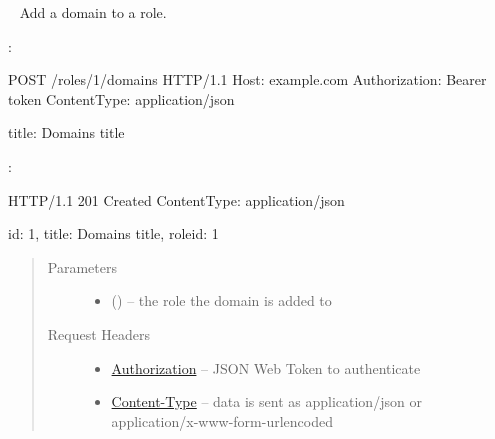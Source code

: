 \documentclass[letterpaper,10pt,english]{sphinxmanual}
\begin{document}
\begin{DUlineblock}{0em}
\item[] 
\end{DUlineblock}


\begin{fulllineitems}
\label{\detokenize{resources/role:post--roles-(role_id)-domains}}~
Add a domain to a role.

:

\begin{sphinxVerbatim}[commandchars=\\\{\}]
POST /roles/1/domains HTTP/1.1
Host: example.com
Authorization: Bearer \PYGZlt{}token\PYGZgt{}
Content\PYGZhy{}Type: application/json

\PYGZob{}
    \PYGZsq{}title\PYGZsq{}: \PYGZsq{}Domain\PYGZsq{}s title\PYGZsq{}
\PYGZcb{}
\end{sphinxVerbatim}

:

\begin{sphinxVerbatim}[commandchars=\\\{\}]
HTTP/1.1 201 Created
Content\PYGZhy{}Type: application/json

\PYGZob{}
    \PYGZsq{}id\PYGZsq{}: 1,
    \PYGZsq{}title\PYGZsq{}: \PYGZsq{}Domain\PYGZsq{}s title\PYGZsq{},
    \PYGZsq{}role\PYGZus{}id\PYGZsq{}: 1
\PYGZcb{}
\end{sphinxVerbatim}
\begin{quote}\begin{description}
\item[{Parameters}] \leavevmode\begin{itemize}
\item {} 
 () -- the role the domain is added to

\end{itemize}

\item[{Request Headers}] \leavevmode\begin{itemize}
\item {} 
\href{http://tools.ietf.org/html/rfc7235\#section-4.2}{Authorization} -- JSON Web Token to authenticate

\item {} 
\href{http://tools.ietf.org/html/rfc7231\#section-3.1.1.5}{Content-Type} -- data is sent as application/json or
application/x-www-form-urlencoded


\end{itemize}
\end{description}
\end{quote}
\end{fulllineitems}
\end{document}
